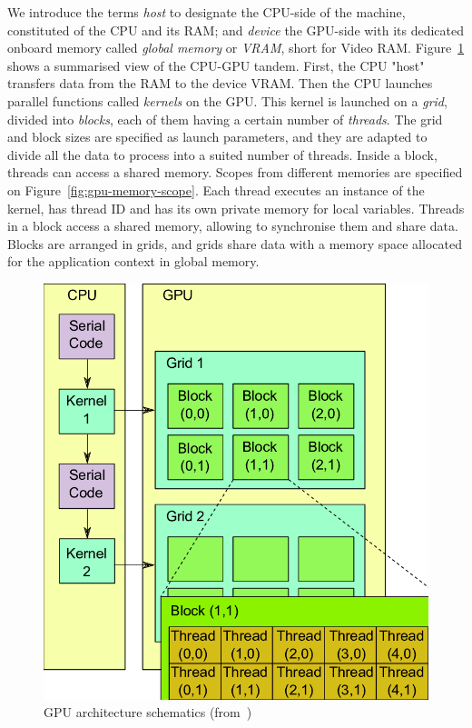 We introduce the terms \emph{host} to designate the CPU-side of the machine, constituted of the CPU and its RAM; and \emph{device} the GPU-side with its dedicated onboard memory called \emph{global memory} or \emph{VRAM}, short for Video RAM. Figure~\ref{fig:gpu-arch} shows a summarised view of the CPU-GPU tandem. First, the CPU "host" transfers data from the RAM to the device VRAM. Then the CPU launches parallel functions called \emph{kernels} on the GPU. This kernel is launched on a \emph{grid}, divided into \emph{blocks}, each of them having a certain number of \emph{threads}. The grid and block sizes are specified as launch parameters, and they are adapted to divide all the data to process into a suited number of threads. Inside a block, threads can access a shared memory. Scopes from different memories are specified on Figure~\ref{fig:gpu-memory-scope}. Each thread executes an instance of the kernel, has thread ID and has its own private memory for local variables. Threads in a block access a shared memory, allowing to synchronise them and share data. Blocks are arranged in grids, and grids share data with a memory space allocated for the application context in global memory.

\begin{figure}[h]
	\centering
	\includegraphics[width=0.6\linewidth]{gpu-arch}
	\caption{GPU architecture schematics (from~\cite{Bartezzaghi:gpu-arch})}
	\label{fig:gpu-arch}
\end{figure}

